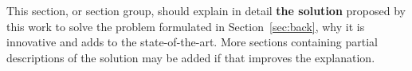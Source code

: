 This section, or section group, should explain in detail {\bf the solution}
proposed by this work to solve the problem formulated in Section~\ref{sec:back},
why it is innovative and adds to the state-of-the-art. More sections containing
partial descriptions of the solution may be added if that improves the
explanation.
